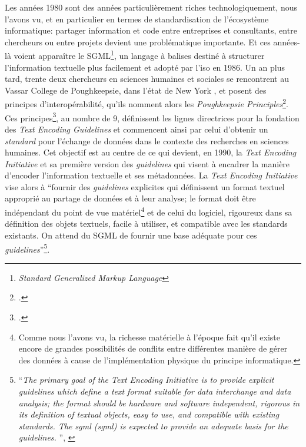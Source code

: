 Les années 1980 sont des années particulièrement riches technologiquement, nous l'avons vu, et en particulier en termes de standardisation de l'écosystème informatique: partager information et code entre entreprises et consultants, entre chercheurs ou entre projets devient une problématique importante. Et ces années-là voient apparaître le SGML\footnote{\textit{Standard Generalized Markup Language}}, un langage à balises destiné à structurer l'information textuelle plus facilement et adopté par l'\acrfull{iso} en 1986. Un an plus tard, trente deux chercheurs en sciences humaines et sociales se rencontrent au Vassar College de Poughkeepsie, dans l'état de New York , et posent des principes d'interopérabilité, qu'ils nomment alors les \textit{Poughkeepsie Principles}\footcite{vanhoutte_introduction_2004}. Ces principes\footcite{noauthor_design_1988}, au nombre de 9, définissent les lignes directrices pour la fondation des \textit{Text Encoding Guidelines} et commencent ainsi par celui d'obtenir un \textit{standard} pour l'échange de données dans le contexte des recherches en sciences humaines. Cet objectif est au centre de ce qui devient, en 1990, la \textit{Text Encoding Initiative} et sa première version des \textit{guidelines} qui visent à encadrer la manière d'encoder l'information textuelle et ses métadonnées. La \textit{Text Encoding Initiative} vise alors à \enquote{fournir des \textit{guidelines} explicites qui définissent un format textuel approprié au partage de données et à leur analyse; le format doit être indépendant du point de vue matériel\footnote{Comme nous l'avons vu, la richesse matérielle à l'époque fait qu'il existe encore de grandes possibilités de conflits entre différentes manière de gérer des données à cause de l'implémentation physique du principe informatique.} et de celui du logiciel, rigoureux dans sa définition des objets textuels, facile à utiliser, et compatible avec les standards existants. On attend du SGML de fournir une base adéquate pour ces \textit{guidelines}}\footnote{\enquote{\textit{The primary goal of the Text Encoding Initiative is to provide explicit guidelines which define a text format suitable for data interchange and data analysis; the format should be hardware and software independent, rigorous in its definition of textual objects, easy to use, and compatible with existing standards. The \acrlong{sgml} (\acrshort{sgml}) is expected to provide an adequate basis for the guidelines. }}, \cite{noauthor_design_1988}}.

